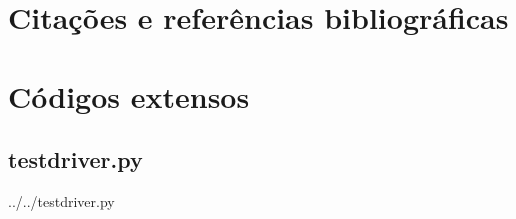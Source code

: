 \documentclass[12pt,a4paper,twoside]{report}
\begin{document}
\chapter{Citações e referências bibliográficas}








\clearpage
{}
\appendix

\chapter{Códigos extensos \label{ap:testdriver}}
\section{testdriver.py}
 {../../testdriver.py}
\end{document}
